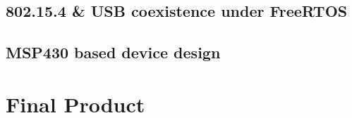 		\subsection{802.15.4 \& USB coexistence under FreeRTOS}

		\subsection{MSP430 based device design}

		\section{Final Product}
